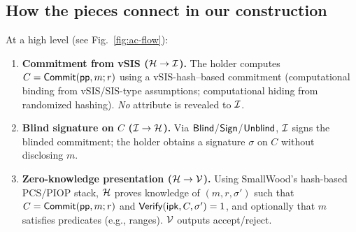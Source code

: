 \subsection{How the pieces connect in our construction}\label{subsec:how-it-connects}

At a high level (see Fig.~\ref{fig:ac-flow}):
\begin{enumerate}[leftmargin=1.25em]
  \item \textbf{Commitment from vSIS (}\(\mathcal{H}\to\mathcal{I}\)\textbf{).} The holder computes \(C=\mathsf{Commit}(\mathsf{pp},m;r)\) using a vSIS-hash–based commitment (computational binding from vSIS/SIS-type assumptions; computational hiding from randomized hashing). \emph{No} attribute is revealed to \(\mathcal{I}\).
  \item \textbf{Blind signature on \(C\) (}\(\mathcal{I}\to\mathcal{H}\)\textbf{).} Via \(\mathsf{Blind}\)/\(\mathsf{Sign}\)/\(\mathsf{Unblind}\), \(\mathcal{I}\) signs the blinded commitment; the holder obtains a signature \(\sigma\) on \(C\) without disclosing \(m\).
  \item \textbf{Zero-knowledge presentation (}\(\mathcal{H}\to\mathcal{V}\)\textbf{).} Using SmallWood’s hash-based PCS/PIOP stack, \(\mathcal{H}\) proves knowledge of \((m,r,\sigma')\) such that \(C=\mathsf{Commit}(\mathsf{pp},m;r)\) and \(\mathsf{Verify}(\mathsf{ipk},C,\sigma')=1\), and optionally that \(m\) satisfies predicates (e.g., ranges). \(\mathcal{V}\) outputs accept/reject.
\end{enumerate}

